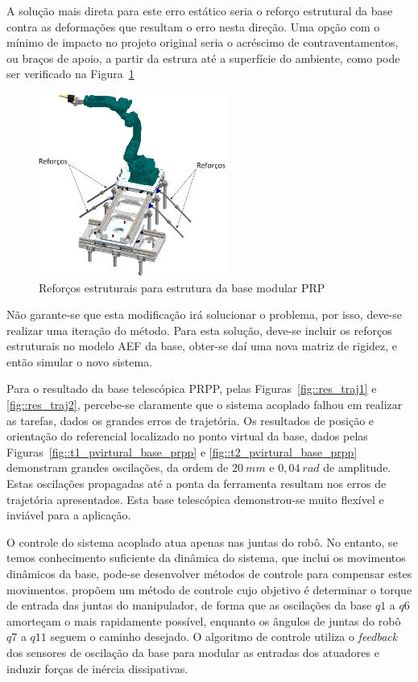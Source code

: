 A solução mais direta para este erro estático seria o reforço estrutural da base
contra as deformações que resultam o erro nesta direção. Uma opção com o mínimo
de impacto no projeto original seria o acréscimo de contraventamentos, ou braços
de apoio, a partir da estrura até a superfície do ambiente, como pode ser
verificado na Figura~\ref{fig::contraventamentos}

\begin{figure}[h!]
	\centering 
 	\includegraphics[width=0.55\textwidth]{figs/contraventamentos}
 	\caption{Reforços estruturais para estrutura da base modular PRP}
 	\label{fig::contraventamentos}
\end{figure}

Não garante-se que esta modificação irá solucionar o problema, por isso, deve-se
realizar uma iteração do método. Para esta solução, deve-se incluir os reforços
estruturais no modelo AEF da base, obter-se daí uma nova matriz de rigidez, e
então simular o novo sistema.

Para o resultado da base telescópica PRPP, pelas Figuras~\ref{fig::res_traj1} e
\ref{fig::res_traj2}, percebe-se claramente que o sistema acoplado falhou em
realizar as tarefas, dados os grandes erros de trajetória. Os resultados de
posição e orientação do referencial localizado no ponto virtual da base, dados
pelas Figuras~\ref{fig::t1_pvirtural_base_prpp} e
\ref{fig::t2_pvirtural_base_prpp} demonstram grandes oscilações, da ordem de
$20~mm$ e $0,04~rad$ de amplitude. Estas oscilações propagadas até a ponta da
ferramenta resultam nos erros de trajetória apresentados. Esta base telescópica
demonstrou-se muito flexível e inviável para a aplicação.

O controle do sistema acoplado atua apenas nas juntas do robô. No entanto, se
temos conhecimento suficiente da dinâmica do sistema, que inclui os movimentos
dinâmicos da base, pode-se desenvolver métodos de controle para compensar estes
movimentos. \citet{lew2001simple} propõem um método de controle cujo objetivo é
determinar o torque de entrada das juntas do manipulador, de forma que as
oscilações da base $q1$ a $q6$ amorteçam o mais rapidamente possível, enquanto
os ângulos de juntas do robô $q7$ a $q11$ seguem o caminho desejado. O algoritmo
de controle utiliza o \textit{feedback} dos sensores de oscilação da base para
modular as entradas dos atuadores e induzir forças de inércia dissipativas.


